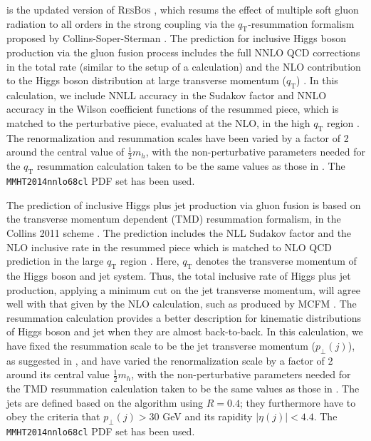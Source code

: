 \subsubsection{\Resbos}
\label{sec:hjetscomp:tools:ares:resbos}

\Resbos is the updated version of \textsc{ResBos} \cite{Balazs:1997xd}, 
which resums the effect of multiple soft gluon radiation to all orders 
in the strong coupling via the $q_\text{T}$-resummation formalism proposed by 
Collins-Soper-Sterman \cite{Collins:1984kg}. The \Resbos prediction 
for inclusive Higgs boson production via the gluon fusion process 
includes the full NNLO QCD corrections in the total rate (similar to 
the setup of a \HNNLO calculation) and 
the NLO contribution to the Higgs boson distribution at large transverse 
momentum ($q_\text{T}$) \cite{Glosser:2002gm}. In this calculation, we include 
NNLL accuracy in the Sudakov factor and NNLO accuracy in the Wilson coefficient functions 
of the resummed piece, which is matched to the perturbative piece, 
evaluated at the NLO, in the high $q_\text{T}$ region \cite{Wang:2012xs}. The 
renormalization and resummation scales have been varied by a factor 
of 2 around the central value of $\tfrac{1}{2}m_h$, with the 
non-perturbative parameters needed for the $q_\text{T}$ resummation calculation 
taken to be the same values as those in \cite{Wang:2012xs}. The 
\texttt{MMHT2014nnlo68cl} PDF set has been used.

The \Resbos prediction of inclusive Higgs plus jet production via 
gluon fusion is based on the transverse momentum dependent (TMD) 
resummation formalism, in the Collins 2011 scheme \cite{Collins:2011zzd}.
The prediction includes the NLL Sudakov factor and the NLO inclusive rate in the 
resummed piece which is matched to NLO QCD prediction in the large 
$q_\text{T}$ region \cite{Sun:2016kkh}. Here, $q_\text{T}$ denotes the transverse 
momentum of the Higgs boson and jet system. Thus, the total 
inclusive rate of Higgs plus jet production, applying a minimum cut on the jet transverse 
momentum, will agree well with that given by the NLO calculation, such 
as produced by MCFM \cite{Campbell:2010ff}. 
The resummation calculation provides a better description for kinematic distributions 
of Higgs boson and jet when they are almost back-to-back. In this 
calculation, we have fixed the resummation scale to be the jet 
transverse momentum ($p_\perp(j)$), as suggested in \cite{Sun:2016kkh}, 
and have varied the renormalization scale by a factor of 2 around its 
central value $\tfrac{1}{2}m_h$, with the non-perturbative parameters 
needed for the TMD resummation calculation taken to be the same values 
as those in \cite{Sun:2016kkh}. The jets are defined based on the \antikt 
algorithm using $R = 0.4$; they furthermore have to obey the criteria that 
$p_\perp(j) > 30$ GeV and its rapidity $|\eta(j)| < 4.4$. The 
\texttt{MMHT2014nnlo68cl} PDF set has been used.


